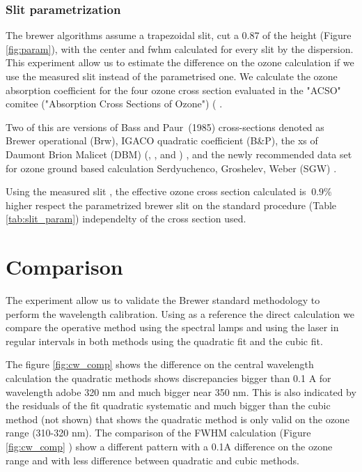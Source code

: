 \documentclass[acp]{copernicus} %
\begin{document}
\subsubsection{Slit parametrization }

The brewer algorithms assume a trapezoidal slit, cut a 0.87 of the height (Figure \ref{fig:param}), with the  center and fwhm  calculated for every slit by the dispersion. This experiment allow us to estimate the difference on the ozone calculation if we use the measured slit instead of the parametrised one. We calculate the ozone absorption coefficient for the four ozone cross section evaluated in the  "ACSO" comitee ("Absorption Cross Sections of Ozone") ( \citet{orphal2016absorption}.

Two of this are versions of  Bass and Paur~(1985) cross-sections denoted as Brewer operational (Brw), IGACO quadratic coefficient (B\&P), the xs of  Daumont Brion Malicet (DBM) (\citet{ daumont_ozone_1992}, \citet{brion_high-resolution_1993}, and \citet{malicet_ozone_1995} ) , and 
 the newly recommended data set for ozone ground based calculation  Serdyuchenco, Groshelev, Weber (SGW) \citep{serdyuchenko_high_2012,gorshelev_high_2012,amt-9-4459-2016}. 


Using the measured slit  ,  the effective ozone cross section calculated is $~0.9\%$ higher respect the parametrized brewer slit on the standard procedure (Table \ref{tab:slit_param}) independelty of the cross section used.


\section{Comparison }

The experiment allow us to validate the Brewer standard methodology to perform the wavelength calibration. Using as a reference the direct calculation we compare the operative method using the spectral lamps and using the laser in regular intervals in both methods using the quadratic fit and the cubic fit.

The figure \ref{fig:cw_comp} shows the difference on the central wavelength calculation the quadratic methods shows discrepancies bigger than 0.1 A for wavelength adobe 320 \unit{nm} and much bigger near 350 nm. This is  also indicated by the residuals of the fit quadratic systematic and much bigger than the cubic method (not shown) that shows  the quadratic method is only valid on the ozone range (310-320 nm). The comparison of the FWHM calculation (Figure \ref{fig:cw_comp} ) show a different pattern with a 0.1A difference on the ozone range and with less difference between quadratic and cubic methods.  
\end{document}
